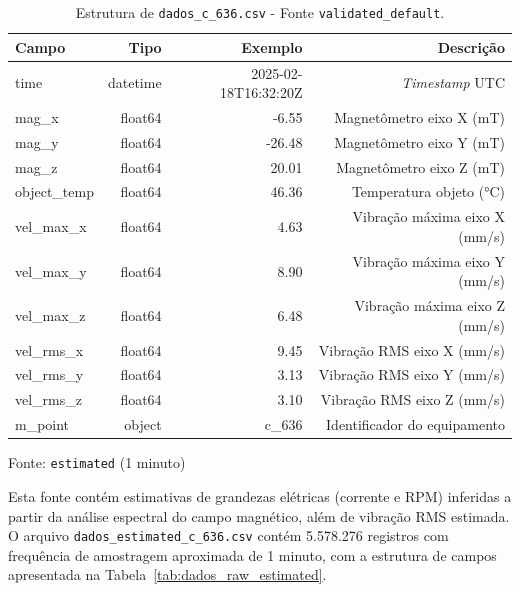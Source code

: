 \begin{table}[H]
  \centering
  \small
  \begin{tabular}{|l|r|r|r|}
    \hline
    \textbf{Campo} & \textbf{Tipo} & \textbf{Exemplo}     & \textbf{Descrição}            \\
    \hline
    time           & datetime      & 2025-02-18T16:32:20Z & \textit{Timestamp} UTC        \\
    mag\_x         & float64       & -6.55                & Magnetômetro eixo X (mT)      \\
    mag\_y         & float64       & -26.48               & Magnetômetro eixo Y (mT)      \\
    mag\_z         & float64       & 20.01                & Magnetômetro eixo Z (mT)      \\
    object\_temp   & float64       & 46.36                & Temperatura objeto (°C)       \\
    vel\_max\_x    & float64       & 4.63                 & Vibração máxima eixo X (mm/s) \\
    vel\_max\_y    & float64       & 8.90                 & Vibração máxima eixo Y (mm/s) \\
    vel\_max\_z    & float64       & 6.48                 & Vibração máxima eixo Z (mm/s) \\
    vel\_rms\_x    & float64       & 9.45                 & Vibração RMS eixo X (mm/s)    \\
    vel\_rms\_y    & float64       & 3.13                 & Vibração RMS eixo Y (mm/s)    \\
    vel\_rms\_z    & float64       & 3.10                 & Vibração RMS eixo Z (mm/s)    \\
    m\_point       & object        & c\_636               & Identificador do equipamento  \\
    \hline
  \end{tabular}
  \caption{Estrutura de \texttt{dados\_c\_636.csv} - Fonte \texttt{validated\_default}.}
  \label{tab:dados_raw_default}
\end{table}

Fonte: \texttt{estimated} (1 minuto)

Esta fonte contém estimativas de grandezas elétricas (corrente e RPM) inferidas a partir da análise espectral do campo magnético, além de vibração RMS estimada. O arquivo \texttt{dados\_estimated\_c\_636.csv} contém 5.578.276 registros com frequência de amostragem aproximada de 1 minuto, com a estrutura de campos apresentada na Tabela~\ref{tab:dados_raw_estimated}.

